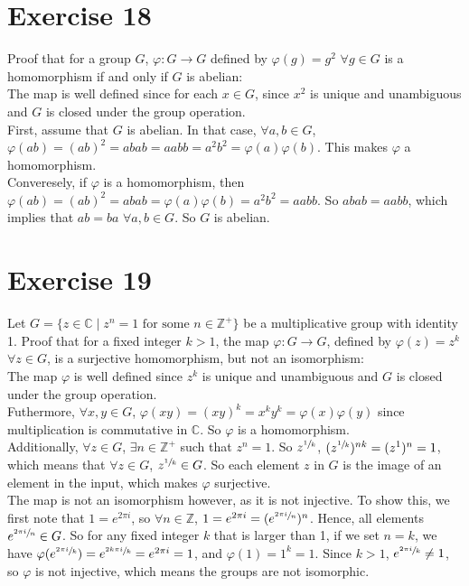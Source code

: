 \documentclass{article}
\newcommand{\Z}{\mathbb{Z}}
\newcommand{\C}{\mathbb{C}}
\begin{document}
    \section*{Exercise 18}
    Proof that for a group $G$, $\varphi: G \to G$
    defined by $\varphi(g) = g^2$ $\forall g \in G$
    is a homomorphism if and only if $G$ is abelian: \\
    The map is well defined since for each $x \in G$, since $x^2$ is unique
    and unambiguous and $G$ is closed under the group operation. \\
    First, assume that $G$ is abelian.
    In that case, $\forall a, b \in G$,
    $\varphi(ab) = (ab)^2
    = abab
    = aabb
    = a^2b^2
    = \varphi(a)\varphi(b)$.
    This makes $\varphi$ a homomorphism. \\ 
    Converesely, if $\varphi$ is a homomorphism,
    then $\varphi(ab) = (ab)^{2}
    = abab
    = \varphi(a)\varphi(b)
    = a^{2}b^{2} 
    = aabb$.
    So $abab = aabb$,
    which implies that $ab = ba$ $\forall a, b \in G$.
    So $G$ is abelian.
    

    \section*{Exercise 19}
    Let $G = \{z \in \C \mid z^n = 1 \text{ for some } n \in \Z^+ \}$
    be a multiplicative group with identity 1.
    Proof that for a fixed integer $k > 1$,
    the map $\varphi: G \to G$,
    defined by $\varphi(z) = z^k$ $\forall z \in G$,
    is a surjective homomorphism, but not an isomorphism: \\
    The map $\varphi$ is well defined since $z^k$ is unique
    and unambiguous and $G$ is closed under the group operation. \\
    Futhermore, $\forall x, y \in G$,
    $\varphi(xy) = (xy)^k = x^ky^k = \varphi(x)\varphi(y)$
    since multiplication is commutative in $\C$. 
    So $\varphi$ is a homomorphism. \\
    Additionally, $\forall z \in G$, $\exists n \in \Z^+$
    such that $z^n = 1$.
    So $z^{\sfrac{1}{k}}$, $(z^{\sfrac{1}{k}})^{nk} = (z^1)^{n} = 1$,
    which means that $\forall z \in G$, $z^{\sfrac{1}{k}} \in G$.
    So each element $z$ in $G$ is the image of an element in the input,
    which makes $\varphi$ surjective. \\
    The map is not an isomorphism however, as it is not injective.
    To show this, we first note that $1 = e^{2 \pi i}$,
    so $\forall n \in \Z$, $1 = e^{2 \pi i} = (e^{\sfrac{2 \pi i}{n}})^n$.
    Hence, all elements $e^{\sfrac{2 \pi i}{n}} \in G$.
    So for any fixed integer $k$ that is larger than 1,
    if we set $n = k$,
    we have $\varphi(e^{\sfrac{2 \pi i}{k}}) = e^{\sfrac{2k \pi i}{k}}
    = e^{2 \pi i} = 1$,
    and $\varphi(1) = 1^k = 1$.
    Since $k > 1$, $e^{\sfrac{2 \pi i}{k}} \neq 1$,
    so $\varphi$ is not injective,
    which means the groups are not isomorphic.
    
\end{document}
